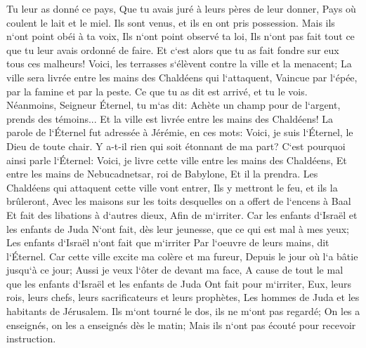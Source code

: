 \verse Tu leur as donné ce pays, Que tu avais juré à leurs pères de leur donner, Pays où coulent le lait et le miel. 
\verse Ils sont venus, et ils en ont pris possession. Mais ils n`ont point obéi à ta voix, Ils n`ont point observé ta loi, Ils n`ont pas fait tout ce que tu leur avais ordonné de faire. Et c`est alors que tu as fait fondre sur eux tous ces malheurs! 
\verse Voici, les terrasses s`élèvent contre la ville et la menacent; La ville sera livrée entre les mains des Chaldéens qui l`attaquent, Vaincue par l`épée, par la famine et par la peste. Ce que tu as dit est arrivé, et tu le vois. 
\verse Néanmoins, Seigneur Éternel, tu m`as dit: Achète un champ pour de l`argent, prends des témoins... Et la ville est livrée entre les mains des Chaldéens! 
\verse La parole de l`Éternel fut adressée à Jérémie, en ces mots: 
\verse Voici, je suis l`Éternel, le Dieu de toute chair. Y a-t-il rien qui soit étonnant de ma part? 
\verse C`est pourquoi ainsi parle l`Éternel: Voici, je livre cette ville entre les mains des Chaldéens, Et entre les mains de Nebucadnetsar, roi de Babylone, Et il la prendra. 
\verse Les Chaldéens qui attaquent cette ville vont entrer, Ils y mettront le feu, et ils la brûleront, Avec les maisons sur les toits desquelles on a offert de l`encens à Baal Et fait des libations à d`autres dieux, Afin de m`irriter. 
\verse Car les enfants d`Israël et les enfants de Juda N`ont fait, dès leur jeunesse, que ce qui est mal à mes yeux; Les enfants d`Israël n`ont fait que m`irriter Par l`oeuvre de leurs mains, dit l`Éternel. 
\verse Car cette ville excite ma colère et ma fureur, Depuis le jour où l`a bâtie jusqu`à ce jour; Aussi je veux l`ôter de devant ma face, 
\verse A cause de tout le mal que les enfants d`Israël et les enfants de Juda Ont fait pour m`irriter, Eux, leurs rois, leurs chefs, leurs sacrificateurs et leurs prophètes, Les hommes de Juda et les habitants de Jérusalem. 
\verse Ils m`ont tourné le dos, ils ne m`ont pas regardé; On les a enseignés, on les a enseignés dès le matin; Mais ils n`ont pas écouté pour recevoir instruction. 
